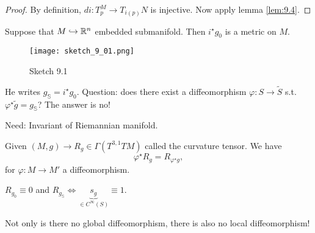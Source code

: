 \begin{proof}
    By definition, \(di:T_p^M\to T_{i(p)}N\) is injective. Now apply lemma \ref{lem:9.4}.
\end{proof}

\begin{example}
    Suppose that \(M\hookrightarrow \mathbb{R}^n\) embedded submanifold. Then \(i^\star g_0\) is a 
    metric on \(M\).
    \begin{figure}[H]\label{fig:9.1}
        \centering
        \texttt{[image: sketch\_9\_01.png]}
        \caption{Sketch 9.1}
    \end{figure}
    He writes \(g_{\mathbb{S}}=i^\star g_0\). 
    Question: does there exist a diffeomorphism \(\varphi:S\to \tilde{S}\) s.t. 
    \(\varphi^\star \tilde{g}=g_{\mathbb{S}}\)? The answer is no!

    Need: Invariant of Riemannian manifold.

\end{example}

Given \((M,g)\to R_g\in \Gamma(T^{3,1}TM)\) called the curvature tensor. We have 
\[\varphi^\star R_g=R_{\varphi^\star g},\]
for \(\varphi:M\to M'\) a diffeomorphism.

 \(R_{g_0}\equiv 0\) and \(R_{g_{\mathbb{S}}}\iff \underbrace{s_{g}}_{\in C^\infty(S)}\equiv 1\).

Not only is there no global diffeomorphism, there is also no local diffeomorphism!


